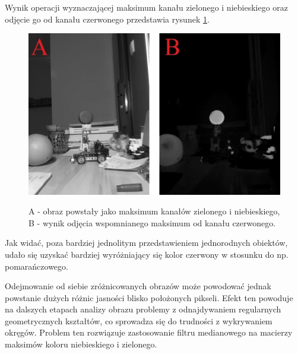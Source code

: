 Wynik operacji wyznaczającej maksimum kanału zielonego i niebieskiego oraz odjęcie go od kanału czerwonego przedstawia rysunek \ref{red-max}.\newpage
\begin{figure}[H]
\begin{center}
\includegraphics[scale=0.42]{imgs/imgMax+RwoBG.jpg}
\caption[Kanał czerwony minus maksimum zielonego i niebieskiego.]\small{A - obraz powstały jako maksimum kanałów zielonego i niebieskiego, B - wynik odjęcia wspomnianego maksimum od kanału czerwonego.}
\label{red-max}
\end{center}
\end{figure}
Jak widać, poza bardziej jednolitym przedstawieniem jednorodnych obiektów, udało się uzyskać bardziej wyróżniający się kolor czerwony w stosunku do np. pomarańczowego.

Odejmowanie od siebie zróżnicowanych obrazów może powodować jednak powstanie dużych różnic jasności blisko położonych pikseli.  Efekt ten powoduje na dalszych etapach analizy obrazu problemy z odnajdywaniem regularnych geometrycznych kształtów, co sprowadza się do trudności z wykrywaniem okręgów. Problem ten rozwiązuje zastosowanie filtru medianowego na macierzy maksimów koloru niebieskiego i zielonego.

